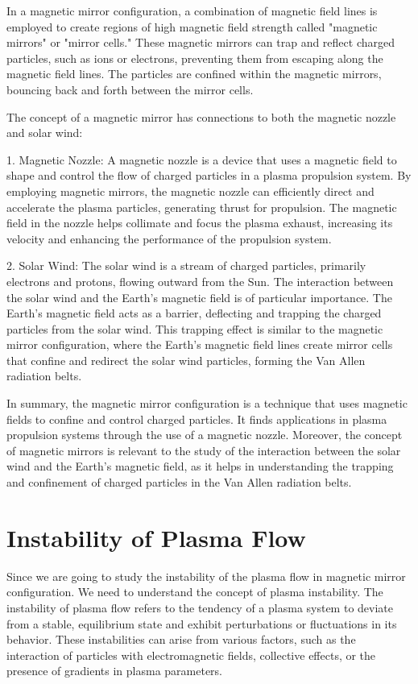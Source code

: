 In a magnetic mirror configuration, a combination of magnetic field lines is employed to create regions of high magnetic field strength called "magnetic mirrors" or "mirror cells." These magnetic mirrors can trap and reflect charged particles, such as ions or electrons, preventing them from escaping along the magnetic field lines. The particles are confined within the magnetic mirrors, bouncing back and forth between the mirror cells.

The concept of a magnetic mirror has connections to both the magnetic nozzle and solar wind:

1. Magnetic Nozzle: A magnetic nozzle is a device that uses a magnetic field to shape and control the flow of charged particles in a plasma propulsion system. By employing magnetic mirrors, the magnetic nozzle can efficiently direct and accelerate the plasma particles, generating thrust for propulsion. The magnetic field in the nozzle helps collimate and focus the plasma exhaust, increasing its velocity and enhancing the performance of the propulsion system.

2. Solar Wind: The solar wind is a stream of charged particles, primarily electrons and protons, flowing outward from the Sun. The interaction between the solar wind and the Earth's magnetic field is of particular importance. The Earth's magnetic field acts as a barrier, deflecting and trapping the charged particles from the solar wind. This trapping effect is similar to the magnetic mirror configuration, where the Earth's magnetic field lines create mirror cells that confine and redirect the solar wind particles, forming the Van Allen radiation belts.

In summary, the magnetic mirror configuration is a technique that uses magnetic fields to confine and control charged particles. It finds applications in plasma propulsion systems through the use of a magnetic nozzle. Moreover, the concept of magnetic mirrors is relevant to the study of the interaction between the solar wind and the Earth's magnetic field, as it helps in understanding the trapping and confinement of charged particles in the Van Allen radiation belts.

\section{Instability of Plasma Flow}
Since we are going to study the instability of the plasma flow in magnetic mirror configuration. We need to understand the concept of plasma instability.
The instability of plasma flow refers to the tendency of a plasma system to deviate from a stable, equilibrium state and exhibit perturbations or fluctuations in its behavior. These instabilities can arise from various factors, such as the interaction of particles with electromagnetic fields, collective effects, or the presence of gradients in plasma parameters.

